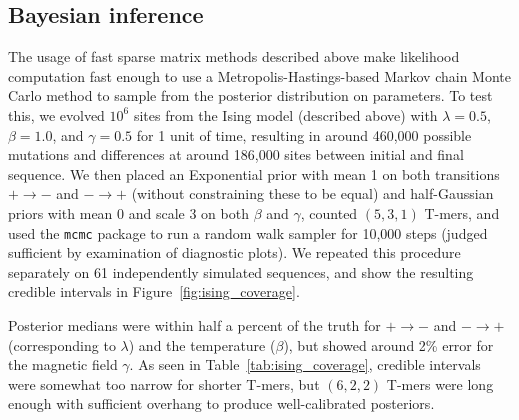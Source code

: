 \documentclass{article}
\theoremstyle{plain}
\theoremstyle{definition}
\begin{document}


\subsection{Bayesian inference}

The usage of fast sparse matrix methods described above make likelihood computation fast enough
to use a Metropolis-Hastings-based Markov chain Monte Carlo method
to sample from the posterior distribution on parameters.
To test this,
we evolved $10^6$ sites from the Ising model (described above) with $\lambda=0.5$, $\beta=1.0$, and $\gamma=0.5$
for 1 unit of time,
resulting in around 460,000 possible mutations
and differences at around 186,000 sites between initial and final sequence.
We then placed an Exponential prior with mean 1 on both transitions $+ \to -$ and $- \to +$
(without constraining these to be equal)
and half-Gaussian priors with mean 0 and scale 3 on both $\beta$ and $\gamma$,
counted $(5,3,1)$ T-mers,
and used the \texttt{mcmc} package \citep{geyer2017mcmc} to run a random walk sampler for 10,000 steps
(judged sufficient by examination of diagnostic plots).
We repeated this procedure separately on 61 independently simulated sequences,
and show the resulting credible intervals in Figure~\ref{fig:ising_coverage}.

Posterior medians were within half a percent of the truth for $+ \to -$ and $- \to +$ (corresponding to $\lambda$)
and the temperature ($\beta$), but showed around 2\% error for the magnetic field $\gamma$.
As seen in Table~\ref{tab:ising_coverage},
credible intervals were somewhat too narrow for shorter T-mers,
but $(6,2,2)$ T-mers were long enough with sufficient overhang to produce well-calibrated posteriors.
\end{document}
